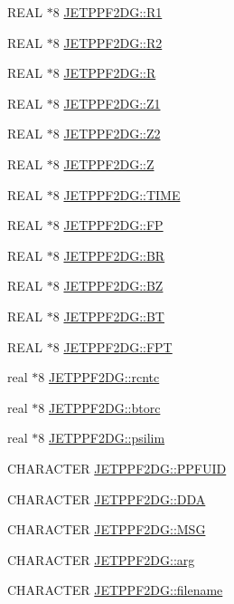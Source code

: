 \begin{CompactItemize}
REAL $\ast$8 \hyperlink{namespaceJETPPF2DG_a8c481ce2a9d8fee1b017a02d4bf7504}{JETPPF2DG::R1}
\item 
REAL $\ast$8 \hyperlink{namespaceJETPPF2DG_737ed75dab8a61babe35ac43c0a217e2}{JETPPF2DG::R2}
\item 
REAL $\ast$8 \hyperlink{namespaceJETPPF2DG_e8aae9ece2ea51185b537f3815875dbe}{JETPPF2DG::R}
\item 
REAL $\ast$8 \hyperlink{namespaceJETPPF2DG_b51d877f8345dc64e86952fa279daa83}{JETPPF2DG::Z1}
\item 
REAL $\ast$8 \hyperlink{namespaceJETPPF2DG_dc17956d43608921538c64177125e1c4}{JETPPF2DG::Z2}
\item 
REAL $\ast$8 \hyperlink{namespaceJETPPF2DG_e77dc9f382919eb823a6a004b79dec10}{JETPPF2DG::Z}
\item 
REAL $\ast$8 \hyperlink{namespaceJETPPF2DG_c9078c3f7f6a9052eb87d78ea959db39}{JETPPF2DG::TIME}
\item 
REAL $\ast$8 \hyperlink{namespaceJETPPF2DG_049a0aaf18dbe2243eb88e6b3098e4d3}{JETPPF2DG::FP}
\item 
REAL $\ast$8 \hyperlink{namespaceJETPPF2DG_e35362876d621deef2d3119b6bec9e86}{JETPPF2DG::BR}
\item 
REAL $\ast$8 \hyperlink{namespaceJETPPF2DG_caf852e3dca62b109e51b850e9a30668}{JETPPF2DG::BZ}
\item 
REAL $\ast$8 \hyperlink{namespaceJETPPF2DG_1f8b39341692faac86ea6fbb52b03493}{JETPPF2DG::BT}
\item 
REAL $\ast$8 \hyperlink{namespaceJETPPF2DG_697e63ef731b230d271dcbe3e66f07b2}{JETPPF2DG::FPT}
\item 
real $\ast$8 \hyperlink{namespaceJETPPF2DG_be3c9bcf4058d9ec55ba6288bdef97fb}{JETPPF2DG::rcntc}
\item 
real $\ast$8 \hyperlink{namespaceJETPPF2DG_b68b36ffa6613e3d1a69d435b2b5aaea}{JETPPF2DG::btorc}
\item 
real $\ast$8 \hyperlink{namespaceJETPPF2DG_35264362cd8206b3671ba0049d7b3d5f}{JETPPF2DG::psilim}
\item 
CHARACTER \hyperlink{namespaceJETPPF2DG_48577f770d2731f2e0b6560b4098131b}{JETPPF2DG::PPFUID}
\item 
CHARACTER \hyperlink{namespaceJETPPF2DG_755c2f476cb350b1019df567507bd092}{JETPPF2DG::DDA}
\item 
CHARACTER \hyperlink{namespaceJETPPF2DG_90aaa1a998c6e80c66375bf2e0f4cc2f}{JETPPF2DG::MSG}
\item 
CHARACTER \hyperlink{namespaceJETPPF2DG_359c6fe9b150c29087e3c047ff7a6701}{JETPPF2DG::arg}
\item 
CHARACTER \hyperlink{namespaceJETPPF2DG_9a2fec5fe980e03ddb99646d384a4d47}{JETPPF2DG::filename}
\end{CompactItemize}


